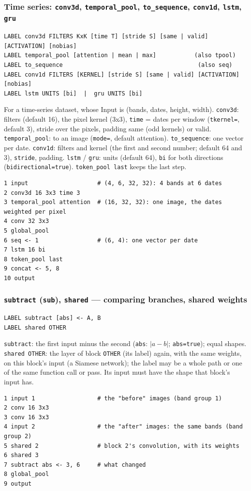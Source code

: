 \subsubsection*{Time series: \texttt{conv3d}, \texttt{temporal\_pool}, \texttt{to\_sequence}, \texttt{conv1d}, \texttt{lstm}, \texttt{gru}}
\begin{Verbatim}[fontsize=\small]
LABEL conv3d FILTERS KxK [time T] [stride S] [same | valid] [ACTIVATION] [nobias]
LABEL temporal_pool [attention | mean | max]           (also tpool)
LABEL to_sequence                                       (also seq)
LABEL conv1d FILTERS [KERNEL] [stride S] [same | valid] [ACTIVATION] [nobias]
LABEL lstm UNITS [bi]  |  gru UNITS [bi]
\end{Verbatim}
For a time-series dataset, whose Input is (bands, dates, height, width). \texttt{conv3d}: filters (default 16), the pixel kernel (3x3),
\texttt{time} = dates per window (\texttt{tkernel=}, default 3), stride over the pixels, padding same (odd kernels) or valid.
\texttt{temporal\_pool}: to an image (\texttt{mode=}, default attention). \texttt{to\_sequence}: one vector per date. \texttt{conv1d}:
filters and kernel (the first and second number; default 64 and 3), \texttt{stride}, padding. \texttt{lstm} / \texttt{gru}: units
(default 64), \texttt{bi} for both directions (\texttt{bidirectional=true}). \texttt{token\_pool last} keeps the last step.
\begin{verbatim}
1 input                    # (4, 6, 32, 32): 4 bands at 6 dates
2 conv3d 16 3x3 time 3
3 temporal_pool attention  # (16, 32, 32): one image, the dates weighted per pixel
4 conv 32 3x3
5 global_pool
6 seq <- 1                 # (6, 4): one vector per date
7 lstm 16 bi
8 token_pool last
9 concat <- 5, 8
10 output
\end{verbatim}

\subsubsection*{\texttt{subtract} (\texttt{sub}), \texttt{shared} --- comparing branches, shared weights}
\begin{Verbatim}[fontsize=\small]
LABEL subtract [abs] <- A, B
LABEL shared OTHER
\end{Verbatim}
\texttt{subtract}: the first input minus the second (\texttt{abs}: $|a-b|$; \texttt{abs=true}); equal shapes. \texttt{shared OTHER}: the
layer of block \texttt{OTHER} (its label) again, with the same weights, on this block's input (a Siamese network); the label may be a
whole path or one of the same function call or pass. Its input must have the shape that block's input has.
\begin{verbatim}
1 input 1                  # the "before" images (band group 1)
2 conv 16 3x3
3 conv 16 3x3
4 input 2                  # the "after" images: the same bands (band group 2)
5 shared 2                 # block 2's convolution, with its weights
6 shared 3
7 subtract abs <- 3, 6     # what changed
8 global_pool
9 output
\end{verbatim}


